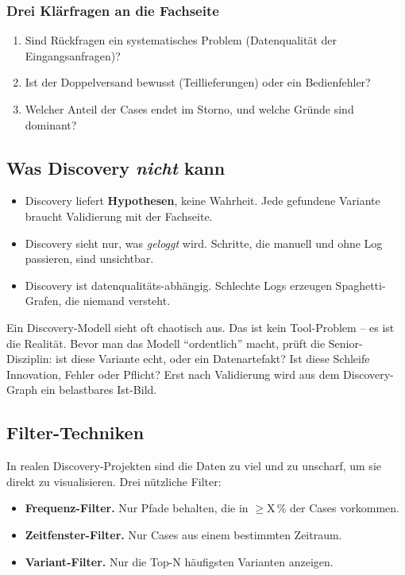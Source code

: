 \documentclass[11pt,a4paper,oneside]{article}
\newcommand{\fachbegriff}[1]{\textbf{#1}}
\begin{document}
\subsubsection{Drei Klärfragen an die Fachseite}

\begin{enumerate}
  \item Sind Rückfragen ein systematisches Problem (Datenqualität der Eingangsanfragen)?
  \item Ist der Doppelversand bewusst (Teillieferungen) oder ein Bedienfehler?
  \item Welcher Anteil der Cases endet im Storno, und welche Gründe sind dominant?
\end{enumerate}

\subsection{Was Discovery \emph{nicht} kann}

\begin{itemize}
  \item Discovery liefert \fachbegriff{Hypothesen}, keine Wahrheit. Jede gefundene Variante braucht Validierung mit der Fachseite.
  \item Discovery sieht nur, was \emph{geloggt} wird. Schritte, die manuell und ohne Log passieren, sind unsichtbar.
  \item Discovery ist datenqualitäts-abhängig. Schlechte Logs erzeugen Spaghetti-Grafen, die niemand versteht.
\end{itemize}

\begin{merkbox}
Ein Discovery-Modell sieht oft chaotisch aus. Das ist kein Tool-Problem -- es ist die Realität. Bevor man das Modell ``ordentlich'' macht, prüft die Senior-Disziplin: ist diese Variante echt, oder ein Datenartefakt? Ist diese Schleife Innovation, Fehler oder Pflicht? Erst nach Validierung wird aus dem Discovery-Graph ein belastbares Ist-Bild.
\end{merkbox}

\subsection{Filter-Techniken}

In realen Discovery-Projekten sind die Daten zu viel und zu unscharf, um sie direkt zu visualisieren. Drei nützliche Filter:

\begin{itemize}
  \item \fachbegriff{Frequenz-Filter.} Nur Pfade behalten, die in $\geq$X\,\% der Cases vorkommen.
  \item \fachbegriff{Zeitfenster-Filter.} Nur Cases aus einem bestimmten Zeitraum.
  \item \fachbegriff{Variant-Filter.} Nur die Top-N häufigsten Varianten anzeigen.
\end{itemize}
\end{document}
